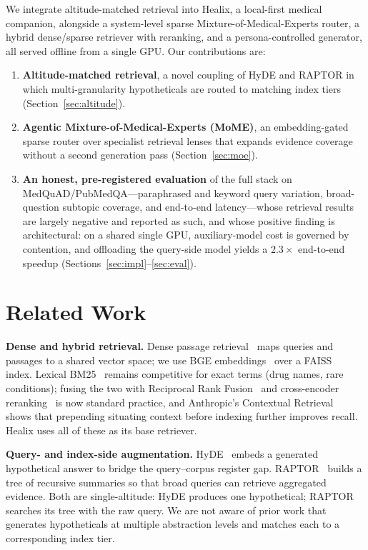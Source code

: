\documentclass[conference]{IEEEtran}
\begin{document}
We integrate altitude-matched retrieval into Healix, a local-first medical
companion, alongside a system-level sparse Mixture-of-Medical-Experts router, a
hybrid dense/sparse retriever with reranking, and a persona-controlled generator,
all served offline from a single GPU. Our contributions are:
\begin{enumerate}
\item \textbf{Altitude-matched retrieval}, a novel coupling of HyDE and RAPTOR in
which multi-granularity hypotheticals are routed to matching index tiers
(Section~\ref{sec:altitude}).
\item \textbf{Agentic Mixture-of-Medical-Experts (MoME)}, an embedding-gated
sparse router over specialist retrieval lenses that expands evidence coverage
without a second generation pass (Section~\ref{sec:moe}).
\item \textbf{An honest, pre-registered evaluation} of the full stack on
MedQuAD/PubMedQA---paraphrased and keyword query variation, broad-question
subtopic coverage, and end-to-end latency---whose retrieval results are largely
negative and reported as such, and whose positive finding is architectural: on a
shared single GPU, auxiliary-model cost is governed by contention, and offloading
the query-side model yields a $2.3\times$ end-to-end speedup
(Sections~\ref{sec:impl}--\ref{sec:eval}).
\end{enumerate}

\section{Related Work}
\textbf{Dense and hybrid retrieval.} Dense passage retrieval~\cite{karpukhin2020dpr}
maps queries and passages to a shared vector space; we use BGE
embeddings~\cite{xiao2024cpack} over a FAISS~\cite{johnson2019faiss} index.
Lexical BM25~\cite{robertson2009bm25} remains competitive for exact terms (drug
names, rare conditions); fusing the two with Reciprocal Rank
Fusion~\cite{cormack2009rrf} and cross-encoder
reranking~\cite{reimers2019sbert} is now standard practice, and Anthropic's
Contextual Retrieval~\cite{anthropic2024contextual} shows that prepending
situating context before indexing further improves recall. Healix uses all of
these as its base retriever.

\textbf{Query- and index-side augmentation.}
HyDE~\cite{gao2023hyde} embeds a generated hypothetical answer to bridge the
query--corpus register gap. RAPTOR~\cite{sarthi2024raptor} builds a tree of
recursive summaries so that broad queries can retrieve aggregated evidence. Both
are single-altitude: HyDE produces one hypothetical; RAPTOR searches its tree
with the raw query. We are not aware of prior work that generates hypotheticals
at multiple abstraction levels and matches each to a corresponding index tier.
\end{document}
